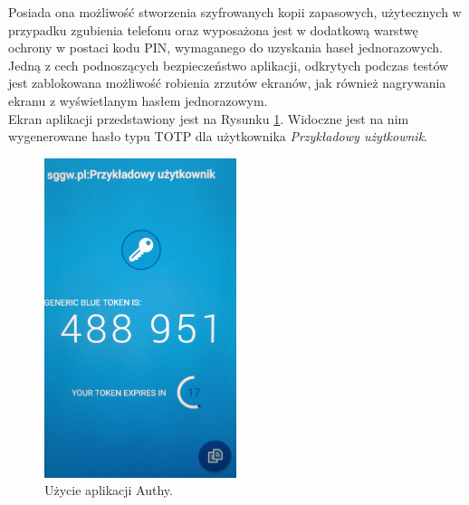 Posiada ona możliwość stworzenia szyfrowanych kopii zapasowych, użytecznych w przypadku zgubienia telefonu oraz
wyposażona jest w dodatkową warstwę ochrony w postaci kodu PIN, wymaganego do uzyskania haseł jednorazowych. \\
Jedną z cech podnoszących bezpieczeństwo aplikacji, odkrytych podczas testów jest zablokowana możliwość 
robienia zrzutów ekranów, jak również nagrywania ekranu z wyświetlanym hasłem jednorazowym. \\
Ekran aplikacji przedstawiony jest na Rysunku \ref{mobile-authy}. 
Widoczne jest na nim wygenerowane hasło typu TOTP dla użytkownika \textit{Przykładowy użytkownik}.
\begin{figure}[t]
    \centering
	\includegraphics[width=0.5\textwidth]{content/images/mobile-authy}
	\caption{Użycie aplikacji Authy.}
    \label{mobile-authy}
\end{figure}


